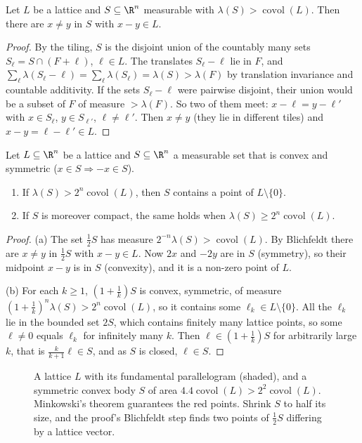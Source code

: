 \begin{lemma}[Blichfeldt]\label{lem:blichfeldt}
Let $L$ be a lattice and $S\subseteq\R^n$ measurable with $\lambda(S)>\operatorname{covol}(L)$. Then there are $x\ne y$ in
$S$ with $x-y\in L$.
\end{lemma}
\begin{proof}
By the tiling, $S$ is the disjoint union of the countably many sets $S_\ell=S\cap(F+\ell)$, $\ell\in L$. The translates
$S_\ell-\ell$ lie in $F$, and $\sum_\ell\lambda(S_\ell-\ell)=\sum_\ell\lambda(S_\ell)=\lambda(S)>\lambda(F)$ by translation
invariance and countable additivity. If the sets $S_\ell-\ell$ were pairwise disjoint, their union would be a subset of
$F$ of measure $>\lambda(F)$. So two of them meet: $x-\ell=y-\ell'$ with $x\in S_\ell$, $y\in S_{\ell'}$, $\ell\ne\ell'$.
Then $x\ne y$ (they lie in different tiles) and $x-y=\ell-\ell'\in L$.
\end{proof}

\begin{theorem}\label{thm:minkowski}
Let $L\subseteq\R^n$ be a lattice and $S\subseteq\R^n$ a measurable set that is convex and symmetric ($x\in S\Rightarrow
-x\in S$).
\begin{enumerate}[label=(\alph*)]
\item If $\lambda(S)>2^n\operatorname{covol}(L)$, then $S$ contains a point of $L\setminus\{0\}$.
\item If $S$ is moreover compact, the same holds when $\lambda(S)\ge2^n\operatorname{covol}(L)$.
\end{enumerate}
\end{theorem}
\begin{proof}
(a) The set $\frac12S$ has measure $2^{-n}\lambda(S)>\operatorname{covol}(L)$. By Blichfeldt there are $x\ne y$ in
$\frac12S$ with $x-y\in L$. Now $2x$ and $-2y$ are in $S$ (symmetry), so their midpoint $x-y$ is in $S$ (convexity), and
it is a non-zero point of $L$.

(b) For each $k\ge1$, $(1+\frac1k)S$ is convex, symmetric, of measure $(1+\frac1k)^n\lambda(S)>2^n\operatorname{covol}(L)$,
so it contains some $\ell_k\in L\setminus\{0\}$. All the $\ell_k$ lie in the bounded set $2S$, which contains finitely
many lattice points, so some $\ell\ne0$ equals $\ell_k$ for infinitely many $k$. Then $\ell\in(1+\frac1k)S$ for
arbitrarily large $k$, that is $\frac{k}{k+1}\ell\in S$, and as $S$ is closed, $\ell\in S$.
\end{proof}

\begin{figure}[ht]
\centering
{}
\caption{A lattice $L$ with its fundamental parallelogram (shaded), and a symmetric convex body $S$ of area
$4.4\operatorname{covol}(L)>2^2\operatorname{covol}(L)$. Minkowski's theorem guarantees the red points. Shrink $S$ to
half its size, and the proof's Blichfeldt step finds two points of $\frac12S$ differing by a lattice vector.}
\label{fig:mink3}
\end{figure}


